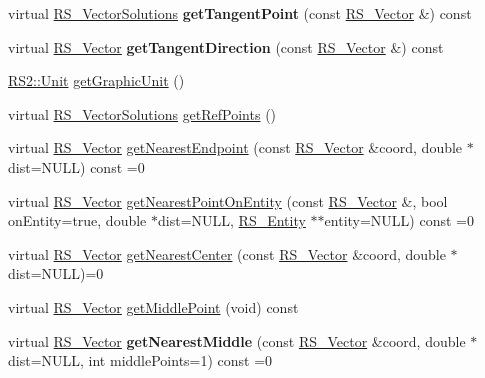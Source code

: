 \begin{DoxyCompactItemize}
\item 
\hypertarget{classRS__Entity_a0da6774b0be9340c0426c0656be0bb52}{virtual \hyperlink{classRS__VectorSolutions}{R\-S\-\_\-\-Vector\-Solutions} {\bfseries get\-Tangent\-Point} (const \hyperlink{classRS__Vector}{R\-S\-\_\-\-Vector} \&) const }\label{classRS__Entity_a0da6774b0be9340c0426c0656be0bb52}

\item 
\hypertarget{classRS__Entity_af089bb081b4575c0fc617e76c9aa6d64}{virtual \hyperlink{classRS__Vector}{R\-S\-\_\-\-Vector} {\bfseries get\-Tangent\-Direction} (const \hyperlink{classRS__Vector}{R\-S\-\_\-\-Vector} \&) const }\label{classRS__Entity_af089bb081b4575c0fc617e76c9aa6d64}

\item 
\hyperlink{classRS2_ad859751df6978737e4f35ec111ff9828}{R\-S2\-::\-Unit} \hyperlink{classRS__Entity_a310cdd4d48df4cf8114388cea80f47d9}{get\-Graphic\-Unit} ()
\item 
virtual \hyperlink{classRS__VectorSolutions}{R\-S\-\_\-\-Vector\-Solutions} \hyperlink{classRS__Entity_a643485f2d50de736f961eefbb7b0f9e2}{get\-Ref\-Points} ()
\item 
virtual \hyperlink{classRS__Vector}{R\-S\-\_\-\-Vector} \hyperlink{classRS__Entity_a933672a9476a6b7a82193caefffecd85}{get\-Nearest\-Endpoint} (const \hyperlink{classRS__Vector}{R\-S\-\_\-\-Vector} \&coord, double $\ast$dist=N\-U\-L\-L) const =0
\item 
virtual \hyperlink{classRS__Vector}{R\-S\-\_\-\-Vector} \hyperlink{classRS__Entity_a791d7868d1c8e1d6c02125e3441d5ce5}{get\-Nearest\-Point\-On\-Entity} (const \hyperlink{classRS__Vector}{R\-S\-\_\-\-Vector} \&, bool on\-Entity=true, double $\ast$dist=N\-U\-L\-L, \hyperlink{classRS__Entity}{R\-S\-\_\-\-Entity} $\ast$$\ast$entity=N\-U\-L\-L) const =0
\item 
virtual \hyperlink{classRS__Vector}{R\-S\-\_\-\-Vector} \hyperlink{classRS__Entity_af9d394411665478aa2f6aca1ac67ba86}{get\-Nearest\-Center} (const \hyperlink{classRS__Vector}{R\-S\-\_\-\-Vector} \&coord, double $\ast$dist=N\-U\-L\-L)=0
\item 
virtual \hyperlink{classRS__Vector}{R\-S\-\_\-\-Vector} \hyperlink{classRS__Entity_aa520c870e22ca2a929c3e6a5a172fdf4}{get\-Middle\-Point} (void) const 
\item 
\hypertarget{classRS__Entity_a48a01e2cfbd417e0ea0166f55d7c61fa}{virtual \hyperlink{classRS__Vector}{R\-S\-\_\-\-Vector} {\bfseries get\-Nearest\-Middle} (const \hyperlink{classRS__Vector}{R\-S\-\_\-\-Vector} \&coord, double $\ast$dist=N\-U\-L\-L, int middle\-Points=1) const =0}\label{classRS__Entity_a48a01e2cfbd417e0ea0166f55d7c61fa}


\end{DoxyCompactItemize}
